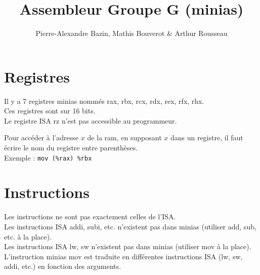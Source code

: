 \documentclass[a4paper]{article}
\title{Assembleur Groupe G (minias)}
\author{Pierre-Alexandre Bazin, Mathis Bouverot \& Arthur Rousseau}
\date{}
\begin{document}
    \maketitle
    \section{Registres}
    Il y a 7 registres minias nommés rax, rbx, rcx, rdx, rex, rfx, rhx.\\
    Ces registres sont sur 16 bits.\\
    Le registre ISA rz n'est pas accessible au programmeur.

    Pour accéder à l'adresse $x$ de la ram, en supposant $x$ dans un registre, 
    il faut écrire le nom du registre entre parenthèses.\\
    Exemple : \texttt{mov (\%rax) \%rbx}
    
    \section{Instructions}
    Les instructions ne sont pas exactement celles de l'ISA.\\
    Les instructions ISA addi, subi, etc. n'existent pas dans minias (utiliser add, sub, etc. à la place).\\ 
    Les instructions ISA lw, sw n'existent pas dans minias (utiliser mov à la place).\\
    L'instruction minias mov est traduite en différentes instructions ISA (lw, sw, addi, etc.) en fonction des arguments.
\end{document}
